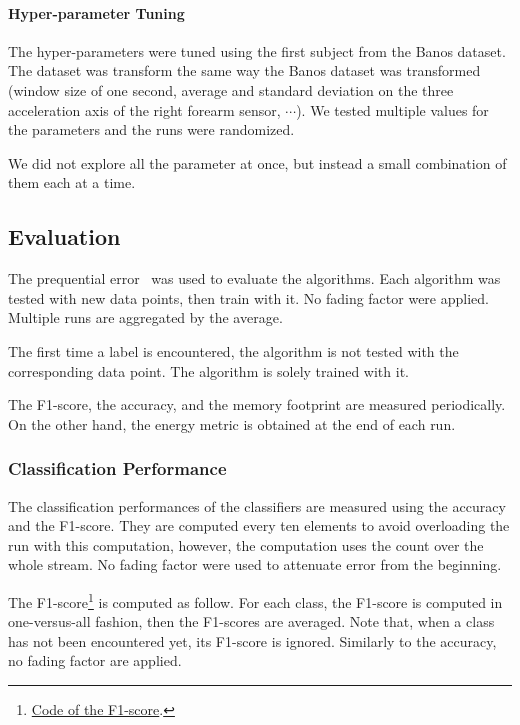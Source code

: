\paragraph{Hyper-parameter Tuning}
The hyper-parameters were tuned using the first subject from the Banos dataset.
The dataset was transform the same way the Banos dataset was transformed
(window size of one second, average and standard deviation on the three
acceleration axis of the right forearm sensor, $\cdots$). We tested multiple
values for the parameters and the runs were randomized.

We did not explore all the parameter at once, but instead a small combination
of them each at a time.

\subsection{Evaluation}
The prequential error~\cite{issues_learning_from_stream} was used to evaluate the algorithms. Each
algorithm was tested with new data points, then train with it. No fading factor
were applied. Multiple runs are aggregated by the average.

The first time a label is encountered, the algorithm is not tested with the
corresponding data point. The algorithm is solely trained with it. 

The F1-score, the accuracy, and the memory footprint are measured periodically.
On the other hand, the energy metric is obtained at the end of each run.

\subsubsection{Classification Performance}
The classification performances of the classifiers are measured using the
accuracy and the F1-score.  They are computed every ten elements to avoid
overloading the run with this computation, however, the computation uses the
count over the whole stream. No fading factor were used to attenuate error from
the beginning.

The
F1-score\footnote{\href{https://github.com/azazel7/paper-benchmark/blob/9adb1039c5a65a00a66d554f0e870d14d3fff7cb/main.cpp\#L82}{Code of the F1-score}.} is computed as follow. For each class, the F1-score is
computed in
one-versus-all fashion, then the F1-scores are averaged. Note that, when a
class has not been encountered yet, its F1-score is ignored. Similarly to the
accuracy, no fading factor are applied.

